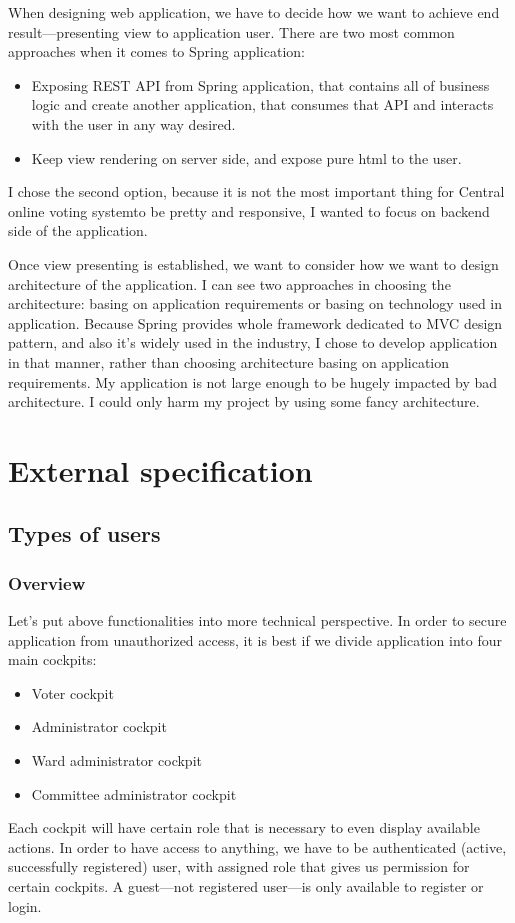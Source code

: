 \documentclass[a4paper,twoside,12pt]{book}
\newcommand{\Title}{Central online voting system}
\begin{document}
    When designing web application, we have to decide how we want to achieve end result---presenting view to application user.
    There are two most common approaches when it comes to Spring application:
    \begin{itemize}
      \item Exposing REST API from Spring application, that contains all of business logic and create another application, that consumes that API and interacts with the user in any way desired.
      \item Keep view rendering on server side, and expose pure html to the user.
    \end{itemize}
    I chose the second option, because it is not the most important thing for \Title to be pretty and responsive, I wanted to focus on backend side of the application.

    Once view presenting is established, we want to consider how we want to design architecture of the application.
    I can see two approaches in choosing the architecture: basing on application requirements or basing on technology used in application.
    Because Spring provides whole framework dedicated to MVC design pattern, and also it's widely used in the industry, I chose to develop application in that manner,
    rather than choosing architecture basing on application requirements. 
    My application is not large enough to be hugely impacted by bad architecture. I could only harm my project by using some fancy architecture.

\chapter{External specification}
  \section{Types of users}
    \subsection{Overview}
    Let's put above functionalities into more technical perspective.
    In order to secure application from unauthorized access, it is best if we divide application into four main cockpits:
    \begin{itemize}
      \item Voter cockpit
      \item Administrator cockpit
      \item Ward administrator cockpit
      \item Committee administrator cockpit
    \end{itemize}
    Each cockpit will have certain role that is necessary to even display available actions. 
    In order to have access to anything, we have to be authenticated (active, successfully registered) user, with assigned role that gives us permission for certain cockpits.
    A guest---not registered user---is only available to register or login.
\end{document}
